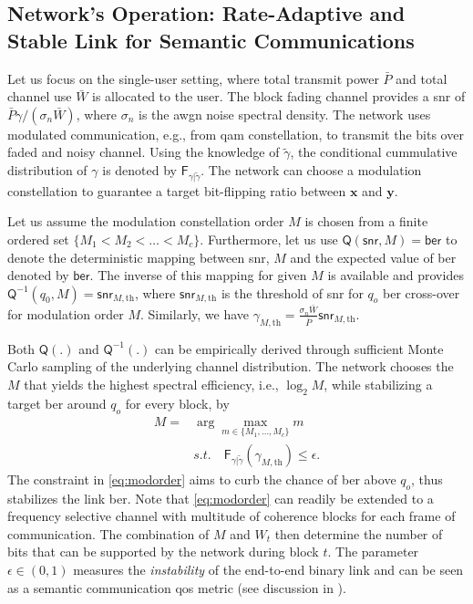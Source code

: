 \subsection{Network's Operation: Rate-Adaptive and Stable Link for  Semantic Communications}
\label{sec:ratelessradiolink}

Let us focus on the single-user setting, where total transmit power $\bar{P}$ and total channel use $\bar{W}$ is allocated to the user. The block fading channel provides a \gls{snr} of $\bar{P}\gamma / (\sigma_n \bar{W})$, where $\sigma_n$ is the \gls{awgn} noise spectral density. The network uses modulated communication, e.g., from \gls{qam} constellation, to transmit the bits over  faded and noisy channel. Using the knowledge of  $\tilde{\gamma}$, the conditional cummulative distribution of $\gamma$ is denoted by $\mathsf{F}_{\gamma | \tilde{\gamma}}$.
The network can choose a  modulation constellation to guarantee a target bit-flipping ratio between $\mathbf{x}$ and $\mathbf{y}$. 

Let us assume the modulation  constellation order $M$ is chosen from a finite ordered set $ \{M_1 < M_2 < \ldots < M_c\}$. Furthermore, let us use $\mathsf{Q}(\mathsf{snr},M) = \mathsf{ber}$ to denote the deterministic mapping between \gls{snr}, $M$ and the expected value of \gls{ber} denoted by $\mathsf{ber}$. The inverse of this mapping for given $M$ is  available and provides  $\mathsf{Q}^{-1}(q_0,M) = \mathsf{snr}_{M,\text{th}}$, where $\mathsf{snr}_{M,\text{th}}$ is the threshold of \gls{snr} for $q_o$ \gls{ber} cross-over for modulation order $M$. Similarly, we have $\mathsf{\gamma}_{M,\text{th}} = \frac{\sigma_n \bar{W} } { \bar{P}} \mathsf{snr}_{M,\text{th}}$.

Both $\mathsf{Q}(.)$ and $\mathsf{Q}^{-1}(.)$ can be empirically derived through sufficient Monte Carlo sampling of the underlying channel distribution.  The network chooses the $M$  that yields the highest spectral efficiency, i.e.,  $\log_2 M$, while stabilizing a target \gls{ber} around $q_o$ for every block, by
\begin{align} \label{eq:modorder}
M = & \arg \max_{m \in \{M_1, \ldots,  M_c\}}  m
\\ \nonumber
&  s.t.  \quad \mathsf{F}_{\gamma | \tilde{\gamma}}\left( \mathsf{\gamma}_{M,\text{th}} \right) \leq \epsilon.
\end{align}
The constraint in \eqref{eq:modorder} aims to curb the chance of \gls{ber} above $q_o$, thus stabilizes the link \gls{ber}.  Note that \eqref{eq:modorder} can readily be extended to a frequency selective channel with multitude of coherence blocks for each frame of communication.
The combination of $M$ and ${W}_t$ then determine the number of bits  that can be supported by the network during block $t$. The parameter $\epsilon \in (0, 1) $ measures the \emph{instability} of the end-to-end binary link  and can be seen as a semantic communication \gls{qos} metric (see discussion in ).

